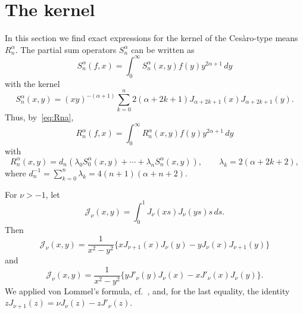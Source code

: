 \documentclass[a4paper]{amsart}
\newcommand{\calJ}{\mathcal{J}}
\begin{document}
\section{The kernel}
\label{sec:kernel}

In this section we find exact expressions for the kernel of the Ces\`aro-type
means~$R^\alpha_n$.
The partial sum operators $S_n^\alpha $ can be written as
\begin{equation}
\label{eq:Sn}
  S^\alpha_n(f,x) = \int_0^\infty S_n^\alpha(x,y) f(y) y^{2\alpha+1}\,dy
\end{equation}
with the kernel
\begin{equation*}
  S_n^\alpha(x,y) = (xy)^{-(\alpha+1)}
    \sum_{k=0}^n 2(\alpha+2k+1) J_{\alpha+2k+1}(x)J_{\alpha+2k+1}(y).
\end{equation*}
Thus, by~\eqref{eq:Rna},
\begin{equation*}
  R^\alpha_n(f,x) = \int_0^\infty R_n^\alpha(x,y)f(y)y^{2\alpha+1}\,dy
\end{equation*}
with
\begin{equation*}
  R_n^\alpha(x,y)
  = d_n \left(\lambda_0 S_0^\alpha(x,y) + \cdots
  + \lambda_n S_n^\alpha(x,y)\right),
  \qquad \lambda_k = 2(\alpha+2k+2),
\end{equation*}
where $d_n^{-1} = \sum_{k=0}^n \lambda_k=4(n+1)(\alpha+n+2)$.

For $\nu>-1$, let
\begin{equation}
\label{eq:phi1}
  \calJ_\nu(x,y) = \int_0^1 J_\nu(xs) J_\nu(ys) s\,ds.
\end{equation}
Then
\begin{equation}
\label{eq:phi2}
  \calJ_\nu(x,y) = \frac{1}{x^2-y^2}\{ xJ_{\nu+1}(x)J_{\nu}(y)
    - yJ_{\nu}(x)J_{\nu+1}(y) \}
\end{equation}
and
\begin{equation}
\label{eq:phi3}
  \calJ_\nu(x,y) = \frac{1}{x^2-y^2}\{ yJ'_{\nu}(y)J_{\nu}(x)
  - xJ'_{\nu}(x)J_{\nu}(y) \}.
\end{equation}
We applied von Lommel's formula, cf.~\cite{CiGPV}, and, for the last equality,
the identity $zJ_{\nu+1}(z) = \nu J_{\nu}(z) - zJ'_{\nu}(z)$.
\end{document}
